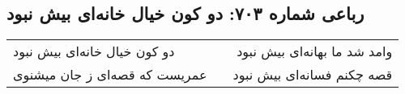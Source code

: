 \begin{center}
\section*{رباعی شماره ۷۰۳: دو کون خیال خانه‌ای بیش نبود}
\label{sec:0703}
\begin{longtable}{l p{0.5cm} r}
دو کون خیال خانه‌ای بیش نبود
&&
وامد شد ما بهانه‌ای بیش نبود
\\
عمریست که قصه‌ای ز جان میشنوی
&&
قصه چکنم فسانه‌ای بیش نبود
\\
\end{longtable}
\end{center}
